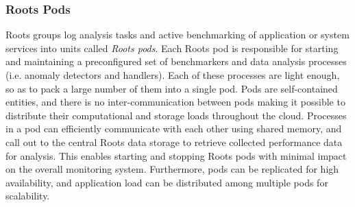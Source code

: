 
\subsubsection{Roots Pods}
\label{sec:process_mgt}


Roots groups log analysis tasks and active benchmarking of application or
system services
into units called \textit{Roots pods}. 
Each Roots pod is responsible for starting and maintaining a preconfigured set of
benchmarkers and data analysis processes (i.e. anomaly detectors and handlers). 
Each of these processes are light enough, so as to pack a large number of them
into a single pod. Pods are self-contained entities, and there is no inter-communication
between pods making it possible to distribute their computational and storage
loads throughout the cloud. 
Processes in a pod can efficiently communicate with each other 
using shared memory, and call out to the central Roots data storage to retrieve 
collected performance data for analysis. This enables starting and stopping 
Roots pods with minimal impact on the overall monitoring system. Furthermore, pods
can be replicated for high availability, and application load can be distributed
among multiple pods for scalability.

